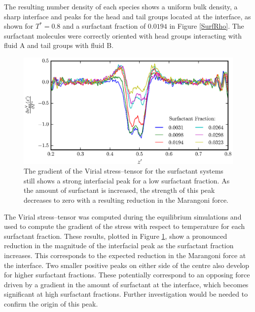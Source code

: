 The resulting number density of each species shows a uniform bulk density, a sharp interface and peaks for the head and tail groups located at the interface, as shown for $T^{*}=0.8$ and a surfactant fraction of $0.0194$ in Figure \ref{SurfRho}.
The surfactant molecules were correctly oriented with head groups interacting with fluid A and tail groups with fluid B.
\FloatBarrier

\begin{figure}[h]
\centering
\includegraphics[scale=0.8]{SurfForce}
\caption{The gradient of the Virial stress--tensor for the surfactant systems still shows a strong interfacial peak for a low surfactant fraction.
As the amount of surfactant is increased, the strength of this peak decreases to zero with a resulting reduction in the Marangoni force.
}
\label{SurfForce}
\end{figure}

The Virial stress--tensor was computed during the equilibrium simulations and used to compute the gradient of the stress with respect to temperature for each surfactant fraction.
These results, plotted in Figure \ref{SurfForce}, show a pronounced reduction in the magnitude of the interfacial peak as the surfactant fraction increases.
This corresponds to the expected reduction in the Marangoni force at the interface.
Two smaller positive peaks on either side of the centre also develop for higher surfactant fractions.
These potentially correspond to an opposing force driven by a gradient in the amount of surfactant at the interface, which becomes significant at high surfactant fractions.
Further investigation would be needed to confirm the origin of this peak.
\FloatBarrier

